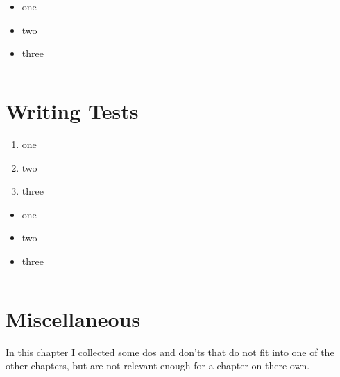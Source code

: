 \begin{itemize}[nosep]
\item{one}
\item{two}
\item{three}
\end{itemize}

\begin{lstlisting}[numbers=left]
\end{lstlisting}

\hrulefill\newpage 
\section{Writing Tests}\label{sec:WritingTests}
\lipsum[1]

\begin{enumerate}[label=P\arabic*.]
\item{one}
\item{two}
\item{three}
\end{enumerate}

\begin{itemize}[nosep]
\item{one}
\item{two}
\item{three}
\end{itemize}

\begin{lstlisting}[numbers=left]
\end{lstlisting}





\section{Miscellaneous}
In this chapter I collected some dos and don'ts that do not fit into one of the other chapters, but are not relevant enough for a chapter on there own.

